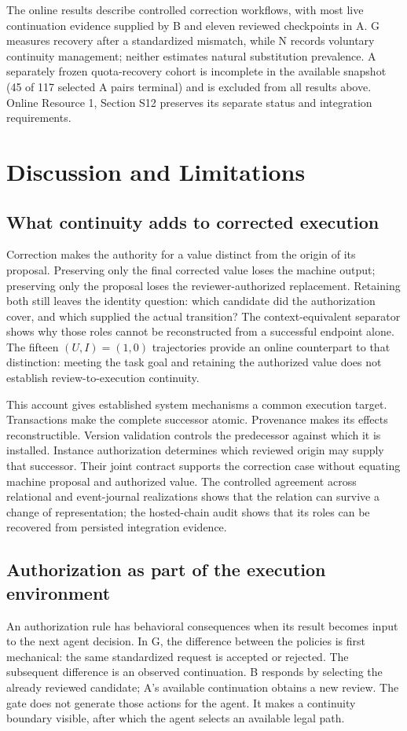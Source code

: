 \documentclass[10pt,a4paper,twocolumn]{article}
\begin{document}
The online results describe controlled correction workflows, with most live continuation evidence supplied by B and eleven reviewed checkpoints in A. G measures recovery after a standardized mismatch, while N records voluntary continuity management; neither estimates natural substitution prevalence. A separately frozen quota-recovery cohort is incomplete in the available snapshot (45 of 117 selected A pairs terminal) and is excluded from all results above. Online Resource 1, Section S12 preserves its separate status and integration requirements.

\section{Discussion and Limitations}
\subsection{What continuity adds to corrected execution}
Correction makes the authority for a value distinct from the origin of its proposal. Preserving only the final corrected value loses the machine output; preserving only the proposal loses the reviewer-authorized replacement. Retaining both still leaves the identity question: which candidate did the authorization cover, and which supplied the actual transition? The context-equivalent separator shows why those roles cannot be reconstructed from a successful endpoint alone. The fifteen $(U,I)=(1,0)$ trajectories provide an online counterpart to that distinction: meeting the task goal and retaining the authorized value does not establish review-to-execution continuity.

This account gives established system mechanisms a common execution target. Transactions make the complete successor atomic. Provenance makes its effects reconstructible. Version validation controls the predecessor against which it is installed. Instance authorization determines which reviewed origin may supply that successor. Their joint contract supports the correction case without equating machine proposal and authorized value. The controlled agreement across relational and event-journal realizations shows that the relation can survive a change of representation; the hosted-chain audit shows that its roles can be recovered from persisted integration evidence.

\subsection{Authorization as part of the execution environment}
An authorization rule has behavioral consequences when its result becomes input to the next agent decision. In G, the difference between the policies is first mechanical: the same standardized request is accepted or rejected. The subsequent difference is an observed continuation. B responds by selecting the already reviewed candidate; A's available continuation obtains a new review. The gate does not generate those actions for the agent. It makes a continuity boundary visible, after which the agent selects an available legal path.
\end{document}
